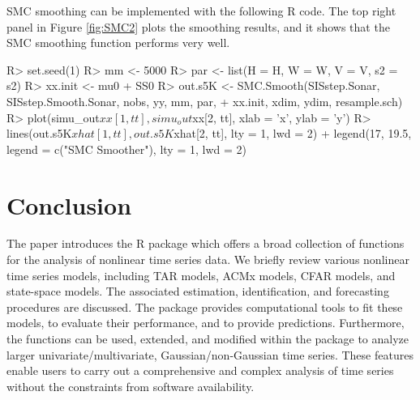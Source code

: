 SMC smoothing can be implemented with the following R code. The top right panel in Figure \ref{fig:SMC2} plots the smoothing results, and it shows that the SMC smoothing function performs very well.
\begin{example}
R> set.seed(1)
R> mm <- 5000
R> par <- list(H = H, W = W, V = V, s2 = s2)
R> xx.init <- mu0 + SS0%
R> out.s5K <- SMC.Smooth(SISstep.Sonar, SISstep.Smooth.Sonar, nobs, yy, mm, par,
+      xx.init, xdim, ydim, resample.sch)
R> plot(simu_out$xx[1, tt], simu_out$xx[2, tt], xlab = 'x', ylab = 'y')
R> lines(out.s5K$xhat[1, tt], out.s5K$xhat[2, tt], lty = 1, lwd = 2)
+      legend(17, 19.5, legend = c("SMC Smoother"), lty = 1, lwd = 2)
\end{example}


\section{Conclusion}
The paper introduces the {R} package  which offers a broad collection of functions for the analysis of nonlinear time series data. We briefly review various nonlinear time series models, including TAR models, ACMx models, CFAR models, and state-space models. The associated estimation, identification, and forecasting procedures are discussed. The  package provides computational tools to fit these models, to evaluate their performance, and to provide predictions. Furthermore, the functions can be used, extended, and modified within the package to analyze larger univariate/multivariate, Gaussian/non-Gaussian time series. These features enable users to carry out a comprehensive and complex analysis of time series without the constraints from software availability.








\address{Xialu Liu\\
  Department of Management Information Systems\\
  San Diego State University\\
  5500 Campanile Drive, San Diego, CA 92182\\
  USA\\
  }

\address{Rong Chen\\
  Department of Statistics\\
  Rutgers University\\
  57 US Highway 1, New Brunswick, NJ 08901\\
  USA\\
  }

